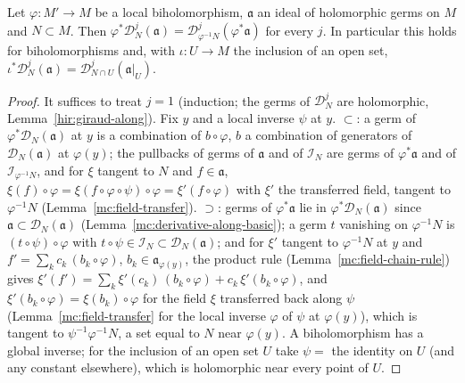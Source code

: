 \begin{proposition}
\label{mc:derivative-along-etale}
\leanok
Let \(\varphi\colon M'\to M\) be a local biholomorphism, \(\mathfrak a\) an ideal of holomorphic germs on \(M\) and \(N\subset M\). Then
\(\varphi^*\mathcal D_N^j(\mathfrak a)=\mathcal D^j_{\varphi^{-1}N}(\varphi^*\mathfrak a)\) for every \(j\). In particular this holds for biholomorphisms and, with
\(\iota\colon U\to M\) the inclusion of an open set, \(\iota^*\mathcal D_N^j(\mathfrak a)=\mathcal D^j_{N\cap U}(\mathfrak a|_U)\).
\end{proposition}
\begin{proof}
\leanok
It suffices to treat \(j=1\) (induction; the germs of \(\mathcal D_N^j\) are holomorphic, Lemma~\ref{hir:giraud-along}). Fix \(y\) and a local inverse \(\psi\) at \(y\).
\(\subset\): a germ of \(\varphi^*\mathcal D_N(\mathfrak a)\) at \(y\) is a combination of \(b\circ\varphi\), \(b\) a combination of generators of \(\mathcal D_N(\mathfrak a)\) at
\(\varphi(y)\); the pullbacks of germs of \(\mathfrak a\) and of \(\mathcal I_N\) are germs of \(\varphi^*\mathfrak a\) and of \(\mathcal I_{\varphi^{-1}N}\), and for \(\xi\) tangent to \(N\) and
\(f\in\mathfrak a\), \(\xi(f)\circ\varphi=\xi(f\circ\varphi\circ\psi)\circ\varphi=\xi'(f\circ\varphi)\) with \(\xi'\) the transferred field, tangent to \(\varphi^{-1}N\)
(Lemma~\ref{mc:field-transfer}). \(\supset\): germs of \(\varphi^*\mathfrak a\) lie in \(\varphi^*\mathcal D_N(\mathfrak a)\) since \(\mathfrak a\subset\mathcal D_N(\mathfrak a)\)
(Lemma~\ref{mc:derivative-along-basic}); a germ \(t\) vanishing on \(\varphi^{-1}N\) is \((t\circ\psi)\circ\varphi\) with \(t\circ\psi\in\mathcal I_N\subset\mathcal D_N(\mathfrak a)\); and
for \(\xi'\) tangent to \(\varphi^{-1}N\) at \(y\) and \(f'=\sum_kc_k\,(b_k\circ\varphi)\), \(b_k\in\mathfrak a_{\varphi(y)}\), the product rule (Lemma~\ref{mc:field-chain-rule}) gives
\(\xi'(f')=\sum_k\xi'(c_k)\,(b_k\circ\varphi)+c_k\,\xi'(b_k\circ\varphi)\), and \(\xi'(b_k\circ\varphi)=\xi(b_k)\circ\varphi\) for the field \(\xi\) transferred back along \(\psi\)
(Lemma~\ref{mc:field-transfer} for the local inverse \(\varphi\) of \(\psi\) at \(\varphi(y)\)), which is tangent to \(\psi^{-1}\varphi^{-1}N\), a set equal to \(N\) near
\(\varphi(y)\). A biholomorphism has a global inverse; for the inclusion of an open set \(U\) take \(\psi=\) the identity on \(U\) (and any constant elsewhere), which
is holomorphic near every point of \(U\).
\end{proof}

